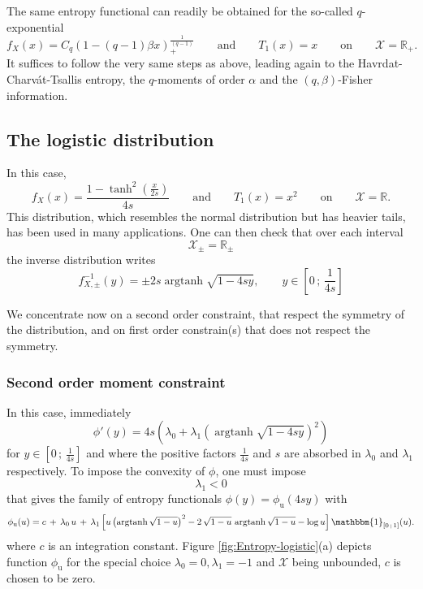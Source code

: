 \documentclass[english,sort&compress]{elsarticle}
\theoremstyle{definition}
\theoremstyle{plain}
\theoremstyle{plain}
\def\Rset{\mathbb{R}}
\def\X{\mathcal{X}}
\def\un{\mathbbm{1}}
\def\argtanh{\operatorname{argtanh}}
\begin{document}
The  same  entropy  functional  can   readily  be  obtained  for  the  so-called
$q$-exponential
% 
\[
f_X(x)  =  C_q \left(  1  -  (q-1)  \beta x  \right)_+^{\frac{1}{(q-1)}}  \qquad
\mbox{and} \qquad T_1(x) = x \qquad \mbox{on} \qquad \X = \Rset_+.
\]
%
It  suffices to  follow  the very  same steps  as  above, leading  again to  the
Havrdat-Charv\'at-Tsallis  entropy, the  $q$-moments of  order $\alpha$  and the
$(q,\beta)$-Fisher information.



\subsection{The logistic distribution}
\label{subsec:Logistic}

In this case, 
%
\[
f_X(x)  = \frac{1  -  \tanh^2\!\left(\frac{x}{2s}\right)}{4s} \qquad  \mbox{and}
\qquad T_1(x) = x^2 \qquad \mbox{on} \qquad \X = \Rset.
\]
This  distribution, which  resembles  the normal  distribution  but has  heavier
tails, has  been used in  many applications. One  can then check that  over each
interval
%
\[
\X_\pm = \Rset_\pm
\]
%
the inverse distribution writes 
%
\[
f_{X,\pm}^{-1}(y) = \pm 2 s \argtanh \sqrt{1-4sy}, \qquad y \in \left[ 0 \, ; \,
  \frac{1}{4s} \right]
\]

We concentrate  now on a second  order constraint, that respect  the symmetry of
the  distribution, and on  first order  constrain(s) that  does not  respect the
symmetry.



\subsubsection{Second order moment constraint}

In this case, immediately 
%
\[
\phi'(y)  =  4  s  \left(  \lambda_0  +  \lambda_1  \left(  \argtanh\sqrt{1-4sy}
  \right)^2 \right)
\]
%
for $y \in \left[ 0 \, ; \, \frac{1}{4s} \right]$ and where the positive factors
$\frac{1}{4   s}$  and  $s$   are  absorbed   in  $\lambda_0$   and  $\lambda_1$
respectively.  To impose the convexity of $\phi$, one must impose
%
\[
\lambda_1 < 0
\]
%
that gives  the family of  entropy functionals $\phi(y) =  \phi_{\mathrm{u}}(4 s
y)$ with
%
\[
\phi_{\mathrm{u}}(u) = c \,  + \,  \lambda_0 \, u  \, +  \, \lambda_1  \left[ u
  \left( \argtanh\sqrt{1-u} \right)^2 -  2 \, \sqrt{1-u} \, \argtanh\sqrt{1-u} -
  \log u \right] \un_{\left[ 0 \, ; \, 1 \right]}(u).
\]
%
where  $c$  is an  integration  constant.  Figure  \ref{fig:Entropy-logistic}(a)
depicts  function $\phi_{\mathrm{u}}$  for the  special choice  $\lambda_0  = 0,
\lambda_1 = -1$ and $\X$ being unbounded, $c$ is chosen to be zero.
\end{document}
